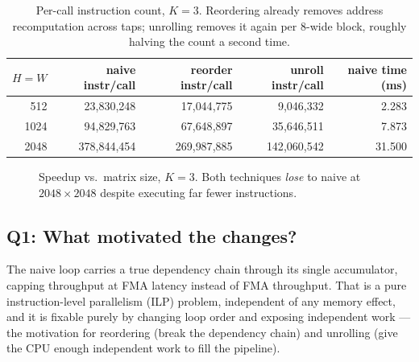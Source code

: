 \documentclass[11pt]{article}
\begin{document}
\begin{table}[h]
\centering
\begin{tabular}{r r r r r}
\toprule
$H{=}W$ & naive instr/call & reorder instr/call & unroll instr/call & naive time (ms) \\
\midrule
512  & 23{,}830{,}248 & 17{,}044{,}775 & 9{,}046{,}332  & 2.283 \\
1024 & 94{,}829{,}763 & 67{,}648{,}897 & 35{,}646{,}511 & 7.873 \\
2048 & 378{,}844{,}454 & 269{,}987{,}885 & 142{,}060{,}542 & 31.500 \\
\bottomrule
\end{tabular}
\caption{Per-call instruction count, $K{=}3$. Reordering already removes address
recomputation across taps; unrolling removes it again per 8-wide block, roughly halving
the count a second time.}
\end{table}

\begin{figure}[h]
\centering
{}
\caption{Speedup vs.\ matrix size, $K{=}3$. Both techniques \emph{lose} to naive at
$2048{\times}2048$ despite executing far fewer instructions.}
\end{figure}

\subsection*{Q1: What motivated the changes?}
The naive loop carries a true dependency chain through its single accumulator, capping
throughput at FMA latency instead of FMA throughput. That is a pure instruction-level
parallelism (ILP) problem, independent of any memory effect, and it is fixable purely by
changing loop order and exposing independent work --- the motivation for reordering
(break the dependency chain) and unrolling (give the CPU enough independent work to fill
the pipeline).
\end{document}
